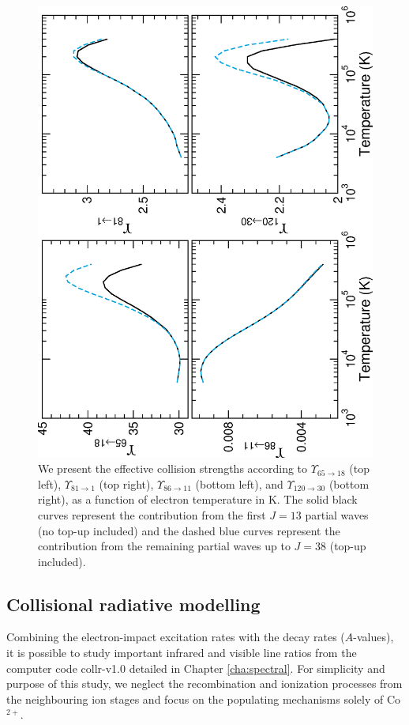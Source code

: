 %
\begin{figure}
\includegraphics[scale=0.59, angle=-90]{Figures/Cobalt/electron/dipole.eps}
\caption{We present the effective collision strengths according to $\Upsilon_{65\rightarrow 18}$ (top left), $\Upsilon_{81\rightarrow 1}$ (top right), $\Upsilon_{86\rightarrow 11}$ (bottom left), and $\Upsilon_{120\rightarrow 30}$ (bottom right), as a function of electron temperature in K. The solid black curves represent the contribution from the first $J=13$ partial waves (no top-up included) and the dashed blue curves represent the contribution from the remaining partial waves up to $J=38$ (top-up included). \label{fig:co_dipole}}
\end{figure}
%

\subsection{Collisional radiative modelling}\label{sec:co_radiative}
Combining the electron-impact excitation rates with the decay rates ($A$-values), it is possible to study important infrared and visible line ratios from the computer code {\sc collr-v1.0} detailed in Chapter \ref{cha:spectral}. For simplicity and purpose of this study, we neglect the recombination and ionization processes from the neighbouring ion stages and focus on the populating mechanisms solely of Co$^{2+}$.

